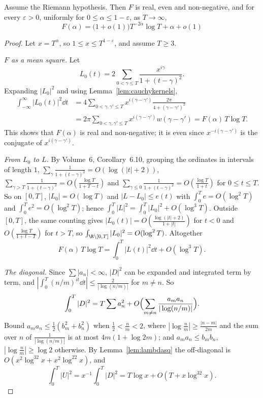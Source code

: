 \begin{theorem}\label{thm:montgomerypc}
Assume the Riemann hypothesis. Then $F$ is real, even and non-negative, and for every $\varepsilon>0$, uniformly for $0\le\alpha\le1-\varepsilon$, as $T\to\infty$,
\[
F(\alpha)=\bigl(1+o(1)\bigr)T^{-2\alpha}\log T+\alpha+o(1)
\]
\end{theorem}
\begin{proof}
Let $x=T^\alpha$, so $1\le x\le T^{1-\varepsilon}$, and assume $T\ge3$.

\emph{$F$ as a mean square.} Let
\[
L_0(t)=2\sum_{0<\gamma\le T}\frac{x^{i\gamma}}{1+(t-\gamma)^2}.
\]
Expanding $|L_0|^2$ and using Lemma~\ref{lem:cauchykernels},
\[
\begin{aligned}\int_{-\infty}^\infty|L_0(t)|^2\dd t&=4\sum_{0<\gamma,\gamma'\le T}x^{i(\gamma-\gamma')}\frac{2\pi}{4+(\gamma-\gamma')^2}\\&=2\pi\sum_{0<\gamma,\gamma'\le T}x^{i(\gamma-\gamma')}w(\gamma-\gamma')=F(\alpha)\,T\log T.\end{aligned}
\]
This shows that $F(\alpha)$ is real and non-negative; it is even since $x^{-i(\gamma-\gamma')}$ is the conjugate of $x^{i(\gamma-\gamma')}$.

\emph{From $L_0$ to $L$.} By Volume~6, Corollary~6.10, grouping the ordinates in intervals of length $1$, $\sum_\gamma\frac1{1+(t-\gamma)^2}=O(\log(|t|+2))$, $\sum_{\gamma>T}\frac1{1+(t-\gamma)^2}=O(\frac{\log T}{1+T-t})$ and $\sum_{\gamma\le0}\frac1{1+(t-\gamma)^2}=O(\frac{\log T}{1+t})$ for $0\le t\le T$. So on $[0,T]$, $|L_0|=O(\log T)$ and $|L-L_0|\le e(t)$ with $\int_0^Te=O(\log^2T)$ and $\int_0^Te^2=O(\log^2T)$; hence $\int_0^T|L|^2=\int_0^T|L_0|^2+O(\log^3T)$. Outside $[0,T]$, the same counting gives $|L_0(t)|=O(\frac{\log(|t|+2)}{1+|t|})$ for $t<0$ and $O(\frac{\log T}{1+t-T})$ for $t>T$, so $\int_{\R\setminus[0,T]}|L_0|^2=O(\log^2T)$. Altogether
\[
F(\alpha)\,T\log T=\int_0^T|L(t)|^2\dd t+O(\log^3T).
\]

\emph{The diagonal.} Since $\sum|a_n|<\infty$, $|D|^2$ can be expanded and integrated term by term, and $|\int_0^T(n/m)^{it}\dd t|\le\frac2{|\log(n/m)|}$ for $m\ne n$. So
\[
\int_0^T|D|^2=T\sum a_n^2+O\Bigl(\sum_{m\ne n}\frac{a_ma_n}{|\log(n/m)|}\Bigr).
\]
Bound $a_ma_n\le\frac12(b_m^2+b_n^2)$ when $\frac12<\frac nm<2$, where $|\log\frac nm|\ge\frac{|n-m|}{2m}$ and the sum over $n$ of $\frac1{|\log(n/m)|}$ is at most $4m(1+\log2m)$; and $a_ma_n\le b_mb_n$, $|\log\frac nm|\ge\log2$ otherwise. By Lemma~\ref{lem:lambdasq} the off-diagonal is $O(x^2\log^32x+x^2\log^22x)$, and
\[
\int_0^T|U|^2=x^{-1}\int_0^T|D|^2=T\log x+O(T+x\log^32x).
\]


\end{proof}
